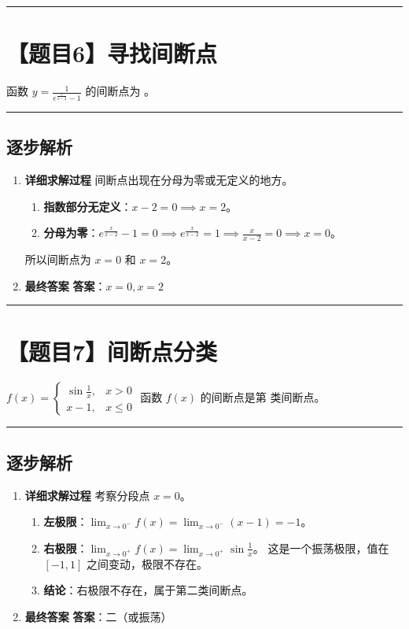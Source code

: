 \documentclass[UTF8]{ctexart}
\newenvironment{redenv}{\color{red}}{}
\newenvironment{detailedanalysis}{%
    \color{red}
    \begin{enumerate}[label=\textbf{第\arabic*步：}, leftmargin=*, align=left, itemsep=1.5ex]
}{%
    \end{enumerate}
}
\newcommand{\problemrule}{\noindent\rule{\textwidth}{1.5pt}\vspace{-0.8em}}
\newcommand{\analysisrule}{\noindent\rule{\textwidth}{0.8pt}\vspace{-0.8em}}
\newcommand{\blank}[1]{\underline{\hspace{#1}}}
\begin{document}
\problemrule
\section*{【题目6】寻找间断点}
函数 $ y=\frac{1}{e^{\frac{x}{x-2}}-1} $ 的间断点为 \blank{2cm}。

\begin{redenv}
\analysisrule
\subsection*{逐步解析}

\begin{detailedanalysis}
\item \textbf{详细求解过程}
间断点出现在分母为零或无定义的地方。
\begin{enumerate}[label=(\arabic*)]
\item \textbf{指数部分无定义}：$x-2=0 \implies x=2$。
\item \textbf{分母为零}：$e^{\frac{x}{x-2}} - 1 = 0 \implies e^{\frac{x}{x-2}} = 1 \implies \frac{x}{x-2} = 0 \implies x = 0$。
\end{enumerate}
所以间断点为 $x=0$ 和 $x=2$。

\item \textbf{最终答案}
\textbf{答案}：$ x=0, x=2 $
\end{detailedanalysis}
\end{redenv}

\problemrule
\section*{【题目7】间断点分类}
$ f(x)=\begin{cases}\sin\frac{1}{x}, & x>0\\ x-1, & x\leq0\end{cases} $ 函数 $ f(x) $ 的间断点是第 \blank{2cm} 类间断点。

\begin{redenv}
\analysisrule
\subsection*{逐步解析}

\begin{detailedanalysis}
\item \textbf{详细求解过程}
考察分段点 $x=0$。
\begin{enumerate}[label=(\arabic*)]
\item \textbf{左极限}：$\lim_{x \to 0^-} f(x) = \lim_{x \to 0^-} (x-1) = -1$。
\item \textbf{右极限}：$\lim_{x \to 0^+} f(x) = \lim_{x \to 0^+} \sin\frac{1}{x}$。
这是一个振荡极限，值在 $[-1, 1]$ 之间变动，极限不存在。
\item \textbf{结论}：右极限不存在，属于第二类间断点。
\end{enumerate}

\item \textbf{最终答案}
\textbf{答案}：二（或振荡）
\end{detailedanalysis}
\end{redenv}
\end{document}
